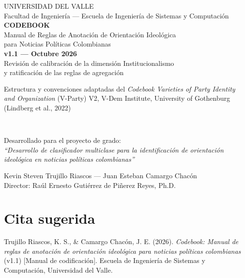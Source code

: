 \documentclass[11pt,letterpaper]{article}
\begin{document}
\thispagestyle{empty}
\begin{center}
\vspace*{1.2cm}
{\headfont\large UNIVERSIDAD DEL VALLE}\\[0.25em]
{\headfont\small Facultad de Ingeniería — Escuela de Ingeniería de Sistemas y Computación}\\[2.6cm]

{\headfont\fontsize{34}{38}\selectfont\color{azul}\bfseries CODEBOOK}\\[0.9em]
{\headfont\large Manual de Reglas de Anotación de Orientación Ideológica}\\[0.3em]
{\headfont\large para Noticias Políticas Colombianas}\\[1.8cm]

{\headfont\large\bfseries v1.1 — Octubre 2026}\\[0.5em]
{\small\color{gris}Revisión de calibración de la dimensión Institucionalismo\\y ratificación de las reglas de agregación}\\[1.6cm]

{\footnotesize\color{gris}\begin{minipage}{0.86\textwidth}\centering
Estructura y convenciones adaptadas del \emph{Codebook Varieties of Party Identity and Organization}
(V-Party) V2, V-Dem Institute, University of Gothenburg (Lindberg et al., 2022)
\end{minipage}}\\[2.2cm]
\end{center}

\noindent Desarrollado para el proyecto de grado:\\
\emph{“Desarrollo de clasificador multiclase para la identificación de orientación ideológica en noticias
políticas colombianas”}

\vspace{0.8em}
\noindent Kevin Steven Trujillo Riascos — Juan Esteban Camargo Chacón\\
Director: Raúl Ernesto Gutiérrez de Piñerez Reyes, Ph.D.

\newpage

\section*{Cita sugerida}
Trujillo Riascos, K. S., \& Camargo Chacón, J. E. (2026). \emph{Codebook: Manual de reglas de anotación de
orientación ideológica para noticias políticas colombianas} (v1.1) [Manual de codificación]. Escuela de
Ingeniería de Sistemas y Computación, Universidad del Valle.
\end{document}
